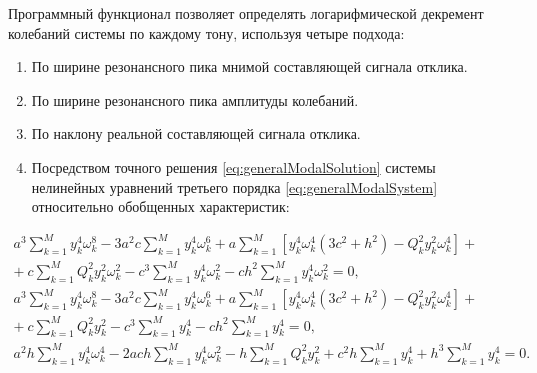 Программный функционал позволяет определять логарифмической декремент колебаний системы по каждому тону, используя четыре подхода:
\begin{enumerate}[topsep = 0pt, noitemsep]
	\item По ширине резонансного пика мнимой составляющей сигнала отклика.
	\item По ширине резонансного пика амплитуды колебаний.
	\item По наклону реальной составляющей сигнала отклика.
	\item Посредством точного решения \eqref{eq:generalModalSolution} системы нелинейных уравнений третьего порядка \eqref{eq:generalModalSystem} относительно обобщенных характеристик:
\end{enumerate}

\begin{equation}
	\begin{aligned}
		a ^ 3 \sum_{k = 1} ^ M y_k ^ 4 \omega_k ^ 8 - 3 a ^ 2 c \sum_{k = 1} ^ M y_k ^ 4 \omega_k ^ 6 + a \sum_{k = 1} ^ M \left[ y_k ^ 4 \omega_k ^ 4 \left(3 c ^ 2 + h ^ 2 \right) - Q_k ^ 2 y_k ^ 2 \omega_k ^ 4 \right] + \\
		+ \ c \sum_{k = 1} ^ M Q_k ^ 2 y_k ^ 2 \omega_k ^ 2 - c ^ 3 \sum_{k = 1} ^ M y_k ^ 4 \omega_k ^ 2 - c h ^ 2 \sum_{k = 1} ^ M y_k ^ 4 \omega_k ^ 2 = 0, \\
		a ^ 3 \sum_{k = 1} ^ M y_k ^ 4 \omega_k ^ 8 - 3 a ^ 2 c \sum_{k = 1} ^ M y_k ^ 4 \omega_k ^ 6 + a \sum_{k = 1} ^ M \left[ y_k ^ 4 \omega_k ^ 4 \left(3 c ^ 2 + h ^ 2 \right) - Q_k ^ 2 y_k ^ 2 \omega_k ^ 4 \right] + \\
		+ \ c \sum_{k = 1} ^ M Q_k ^ 2 y_k ^ 2 - c ^ 3 \sum_{k = 1} ^ M y_k ^ 4 - c h ^ 2 \sum_{k = 1} ^ M y_k ^ 4 = 0, \\
		a ^ 2 h \sum_{k = 1} ^ M y_k ^ 4 \omega_k ^ 4 - 2 a c h \sum_{k = 1} ^ M y_k ^ 4 \omega_k ^ 2 - h \sum_{k = 1} ^ M Q_k ^ 2 y_k ^ 2 + c ^ 2 h \sum_{k = 1} ^ M y_k ^ 4 + h ^ 3 \sum_{k = 1} ^ M y_k ^ 4 = 0. 
	\end{aligned}
	\label{eq:generalModalSystem}
\end{equation}

